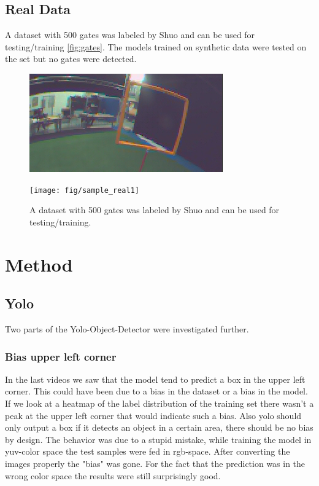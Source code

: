 \documentclass{article}
\begin{document}
\subsection{Real Data}
A dataset with 500 gates was labeled by Shuo and can be used for testing/training \autoref{fig:gates}. The models trained on synthetic data were tested on the set but no gates were detected.
\begin{figure}[h]
	\centering
	\begin{minipage}{0.4\textwidth}
		\centering
		\includegraphics[width=\textwidth]{fig/sample_real}
	\end{minipage}
	\begin{minipage}{0.4\textwidth}
		\centering
		\texttt{[image: fig/sample\_real1]}
	\end{minipage}
	\caption{A dataset with 500 gates was labeled by Shuo and can be used for testing/training.}
	\label{fig:gates}
	\end{figure}
\section{Method}

\subsection{Yolo}

Two parts of the Yolo-Object-Detector were investigated further.

\subsubsection{Bias upper left corner}

In the last videos we saw that the model tend to predict a box in the upper left corner. This could have been due to a bias in the dataset or a bias in the model. If we look at a heatmap of the label distribution of the training set there wasn't a peak at the upper left corner that would indicate such a bias. Also yolo should only output a box if it detects an object in a certain area, there should be no bias by design. The behavior was due to a stupid mistake, while training the model in yuv-color space the test samples were fed in rgb-space. After converting the images properly the "bias" was gone. For the fact that the prediction was in the wrong color space the results were still surprisingly good.
\end{document}
